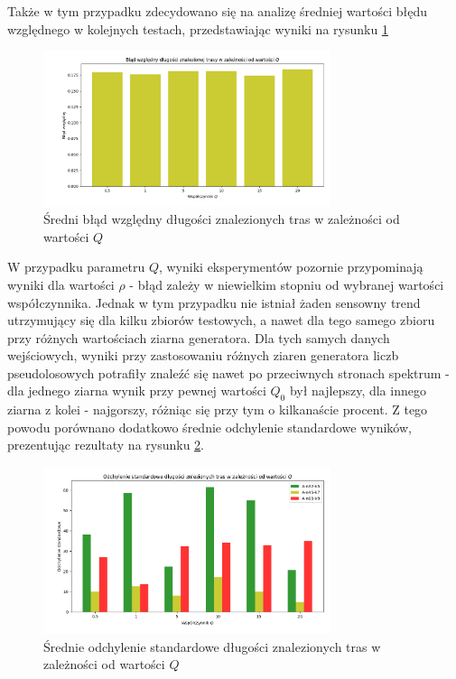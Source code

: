 \documentclass[10pt]{article}
\begin{document}
Także w tym przypadku zdecydowano się na analizę średniej wartości błędu względnego w kolejnych testach, przedstawiając wyniki na rysunku \ref{fig:q}

\begin{figure}[H]
    \centering
    \includegraphics[width=0.75\textwidth]{q.png}
    \caption{Średni błąd względny długości znalezionych tras w zależności od wartości $Q$}
    \label{fig:q}
\end{figure}

W przypadku parametru $Q$, wyniki eksperymentów pozornie przypominają wyniki dla wartości $\rho$ - błąd zależy w niewielkim stopniu od wybranej wartości współczynnika. Jednak w tym przypadku nie istniał żaden sensowny trend utrzymujący się dla kilku zbiorów testowych, a nawet dla tego samego zbioru przy różnych wartościach ziarna generatora. Dla tych samych danych wejściowych, wyniki przy zastosowaniu różnych ziaren generatora liczb pseudolosowych potrafiły znaleźć się nawet po przeciwnych stronach spektrum - dla jednego ziarna wynik przy pewnej wartości $Q_0$ był najlepszy, dla innego ziarna z kolei - najgorszy, różniąc się przy tym o kilkanaście procent. Z tego powodu porównano dodatkowo średnie odchylenie standardowe wyników, prezentując rezultaty na rysunku \ref{fig:deviationq}.

\begin{figure}[H]
    \centering
    \includegraphics[width=0.75\textwidth]{deviation_q.png}
    \caption{Średnie odchylenie standardowe długości znalezionych tras w zależności od wartości $Q$}
    \label{fig:deviationq}
\end{figure}
\end{document}
